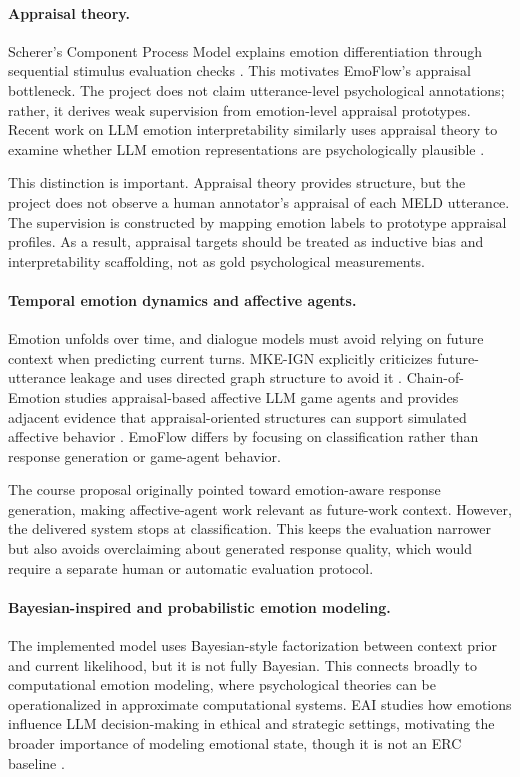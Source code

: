 \documentclass[11pt]{article}
\begin{document}
\paragraph{Appraisal theory.}
Scherer's Component Process Model explains emotion differentiation through sequential stimulus evaluation checks \citep{scherer2001appraisal}. This motivates EmoFlow's appraisal bottleneck. The project does not claim utterance-level psychological annotations; rather, it derives weak supervision from emotion-level appraisal prototypes. Recent work on LLM emotion interpretability similarly uses appraisal theory to examine whether LLM emotion representations are psychologically plausible \citep{tak2025mechanistic}.

This distinction is important. Appraisal theory provides structure, but the project does not observe a human annotator's appraisal of each MELD utterance. The supervision is constructed by mapping emotion labels to prototype appraisal profiles. As a result, appraisal targets should be treated as inductive bias and interpretability scaffolding, not as gold psychological measurements.

\paragraph{Temporal emotion dynamics and affective agents.}
Emotion unfolds over time, and dialogue models must avoid relying on future context when predicting current turns. MKE-IGN explicitly criticizes future-utterance leakage and uses directed graph structure to avoid it \citep{tu2024mkeign}. Chain-of-Emotion studies appraisal-based affective LLM game agents and provides adjacent evidence that appraisal-oriented structures can support simulated affective behavior \citep{croissant2024chain}. EmoFlow differs by focusing on classification rather than response generation or game-agent behavior.

The course proposal originally pointed toward emotion-aware response generation, making affective-agent work relevant as future-work context. However, the delivered system stops at classification. This keeps the evaluation narrower but also avoids overclaiming about generated response quality, which would require a separate human or automatic evaluation protocol.

\paragraph{Bayesian-inspired and probabilistic emotion modeling.}
The implemented model uses Bayesian-style factorization between context prior and current likelihood, but it is not fully Bayesian. This connects broadly to computational emotion modeling, where psychological theories can be operationalized in approximate computational systems. EAI studies how emotions influence LLM decision-making in ethical and strategic settings, motivating the broader importance of modeling emotional state, though it is not an ERC baseline \citep{mozikov2024eai}.
\end{document}
